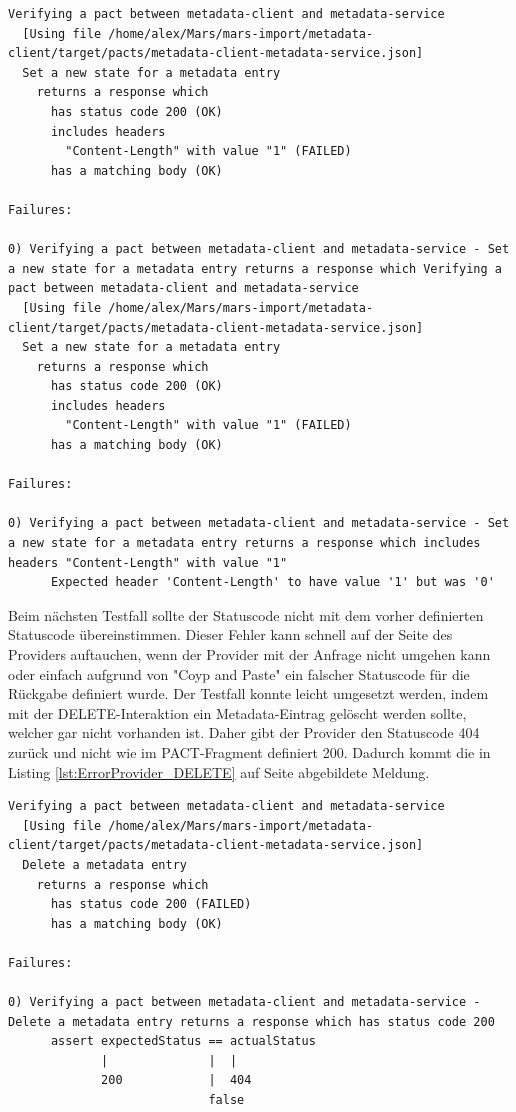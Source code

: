 \documentclass{llncs}
\begin{document}
\begin{lstlisting}[caption=Test,label={lst:ErrorProvider_PUT}]
Verifying a pact between metadata-client and metadata-service
  [Using file /home/alex/Mars/mars-import/metadata-client/target/pacts/metadata-client-metadata-service.json]
  Set a new state for a metadata entry
    returns a response which
      has status code 200 (OK)
      includes headers
        "Content-Length" with value "1" (FAILED)
      has a matching body (OK)

Failures:

0) Verifying a pact between metadata-client and metadata-service - Set a new state for a metadata entry returns a response which Verifying a pact between metadata-client and metadata-service
  [Using file /home/alex/Mars/mars-import/metadata-client/target/pacts/metadata-client-metadata-service.json]
  Set a new state for a metadata entry
    returns a response which
      has status code 200 (OK)
      includes headers
        "Content-Length" with value "1" (FAILED)
      has a matching body (OK)

Failures:

0) Verifying a pact between metadata-client and metadata-service - Set a new state for a metadata entry returns a response which includes headers "Content-Length" with value "1"
      Expected header 'Content-Length' to have value '1' but was '0'
\end{lstlisting}
      
Beim nächsten Testfall sollte der Statuscode nicht mit dem vorher definierten Statuscode übereinstimmen. Dieser Fehler kann schnell auf der Seite des Providers auftauchen, wenn der Provider mit der Anfrage nicht umgehen kann oder einfach aufgrund von "Coyp and Paste" ein falscher Statuscode für die Rückgabe definiert wurde. Der Testfall konnte leicht umgesetzt werden, indem mit der DELETE-Interaktion ein Metadata-Eintrag gelöscht werden sollte, welcher gar nicht vorhanden ist. Daher gibt der Provider den Statuscode 404 zurück und nicht wie im PACT-Fragment definiert 200. Dadurch kommt die in Listing \ref{lst:ErrorProvider_DELETE} auf Seite \pageref{lst:ErrorProvider_DELETE} abgebildete Meldung.  

\begin{lstlisting}[caption=Test,label={lst:ErrorProvider_DELETE}]
Verifying a pact between metadata-client and metadata-service
  [Using file /home/alex/Mars/mars-import/metadata-client/target/pacts/metadata-client-metadata-service.json]
  Delete a metadata entry
    returns a response which
      has status code 200 (FAILED)
      has a matching body (OK)

Failures:

0) Verifying a pact between metadata-client and metadata-service - Delete a metadata entry returns a response which has status code 200
      assert expectedStatus == actualStatus
             |              |  |
             200            |  404
                            false
\end{lstlisting}
\end{document}
